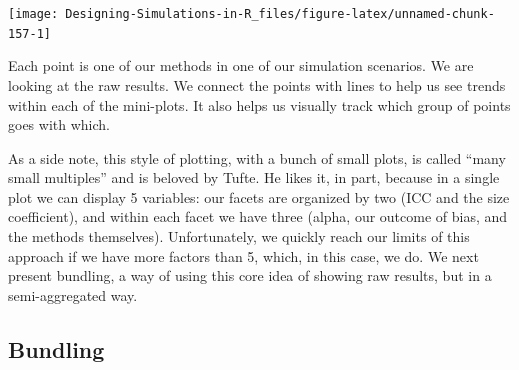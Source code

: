 \documentclass[
]{book}
\newenvironment{Shaded}{\begin{snugshade}}{\end{snugshade}}
\newcommand{\AttributeTok}[1]{\textcolor[rgb]{0.13,0.29,0.53}{#1}}
\newcommand{\DecValTok}[1]{\textcolor[rgb]{0.00,0.00,0.81}{#1}}
\newcommand{\FunctionTok}[1]{\textcolor[rgb]{0.13,0.29,0.53}{\textbf{#1}}}
\newcommand{\NormalTok}[1]{#1}
\newcommand{\OtherTok}[1]{\textcolor[rgb]{0.56,0.35,0.01}{#1}}
\newcommand{\SpecialCharTok}[1]{\textcolor[rgb]{0.81,0.36,0.00}{\textbf{#1}}}
\begin{document}
\begin{Shaded}
\end{Shaded}

\begin{center}\texttt{[image: Designing-Simulations-in-R\_files/figure-latex/unnamed-chunk-157-1]} \end{center}

Each point is one of our methods in one of our simulation scenarios.
We are looking at the raw results.
We connect the points with lines to help us see trends within each of the mini-plots.
It also helps us visually track which group of points goes with which.

As a side note, this style of plotting, with a bunch of small plots, is called
``many small multiples'' and is beloved by Tufte.
He likes it, in part, because in a single plot we can display 5 variables: our facets are organized by two (ICC and the size coefficient), and within each facet we have three (alpha, our outcome of bias, and the methods themselves).
Unfortunately, we quickly reach our limits of this approach if we have more factors than 5, which, in this case, we do.
We next present bundling, a way of using this core idea of showing raw results, but in a semi-aggregated way.

\subsection{Bundling}\label{bundling}
\end{document}

